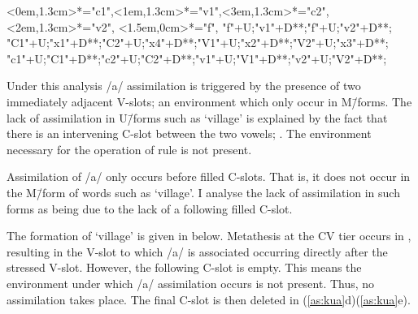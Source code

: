 \begin{multicols}{3}
\begin{exe}
{\begin{xlist}
{			<0em,1.3cm>*="c1",<1em,1.3cm>*="v1",<3em,1.3cm>*="c2",<2em,1.3cm>*="v2",
			<1.5em,0cm>*="f",
			"f"+U;"v1"+D**\dir{-};"f"+U;"v2"+D**\dir{-};
			"C1"+U;"x1"+D**\dir{-};"C2"+U;"x4"+D**\dir{-};"V1"+U;"x2"+D**\dir{-};"V2"+U;"x3"+D**\dir{-};
			"c1"+U;"C1"+D**\dir{-};"c2"+U;"C2"+D**\dir{-};"v1"+U;"V1"+D**\dir{-};"v2"+U;"V2"+D**\dir{-};
		\endxy}\label{as:niim6}
	\end{xlist}}
\end{exe}
\end{multicols}

Under this analysis /a/ assimilation is triggered by the presence
of two immediately adjacent V-slots;
an environment which only occur in M\=/forms.
The lack of assimilation in U\=/forms such as  `village' is
explained by the fact that there is an intervening C-slot between
the two vowels; .
The environment necessary for the operation
of rule  is not present.

Assimilation of /a/ only occurs before filled C-slots.
That is, it does not occur in the M\=/form of words
such as  {\ra}  `village'.
I analyse the lack of assimilation in such forms as being due
to the lack of a following filled C-slot.

The formation of  {\ra}  `village'
is given in  below.
Metathesis at the CV tier occurs in ,
resulting in the V-slot to which /a/ is associated occurring directly after the stressed V-slot.
However, the following C-slot is empty.
This means the environment under which /a/ assimilation occurs is not present.
Thus, no assimilation takes place.
The final C-slot is then deleted in (\ref{as:kua}d){\textendash}(\ref{as:kua}e).

